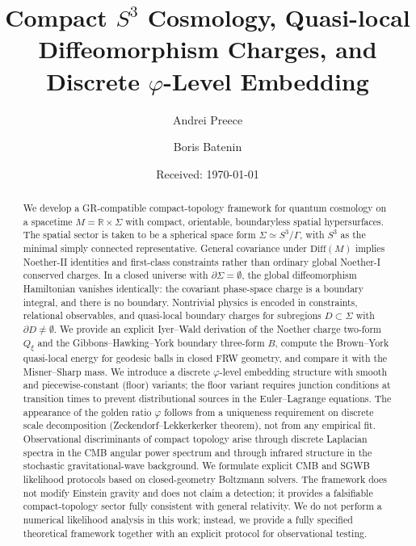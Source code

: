 \documentclass[12pt,a4paper]{article}
\newcommand{\Sig}{\Sigma}           %
\newcommand{\pa}{\partial}          %
\newcommand{\Diff}{\mathrm{Diff}}
\newcommand{\Qxi}{Q_\xi}
\begin{document}
\title{Compact $S^3$ Cosmology, Quasi-local Diffeomorphism
       Charges, and Discrete $\varphi$-Level Embedding}



\author[1]{Andrei Preece}
\author[1]{Boris Batenin}


\date{Received: \today}

\maketitle

\begin{abstract}
We develop a GR-compatible compact-topology framework for
quantum cosmology on a spacetime $M = \mathbb{R}\times\Sig$
with compact, orientable, boundaryless spatial hypersurfaces.
The spatial sector is taken to be a spherical space form
$\Sig \simeq S^3/\Gamma$, with $S^3$ as the minimal simply
connected representative. General covariance under
$\Diff(M)$ implies Noether-II identities and first-class
constraints rather than ordinary global Noether-I conserved
charges. In a closed universe with $\pa\Sig = \emptyset$,
the global diffeomorphism Hamiltonian vanishes identically:
the covariant phase-space charge is a boundary integral, and
there is no boundary. Nontrivial physics is encoded in
constraints, relational observables, and quasi-local boundary
charges for subregions $D\subset\Sig$ with $\pa D\neq\emptyset$.
We provide an explicit Iyer--Wald derivation of the Noether
charge two-form $\Qxi$ and the Gibbons--Hawking--York boundary
three-form $B$, compute the Brown--York quasi-local energy
for geodesic balls in closed FRW geometry, and compare it
with the Misner--Sharp mass. We introduce a discrete
$\varphi$-level embedding structure with smooth and
piecewise-constant (floor) variants; the floor variant
requires junction conditions at transition times to prevent
distributional sources in the Euler--Lagrange equations.
The appearance of the golden ratio $\varphi$ follows from a
uniqueness requirement on discrete scale decomposition
(Zeckendorf--Lekkerkerker theorem), not from any empirical
fit. Observational discriminants of compact topology arise
through discrete Laplacian spectra in the CMB angular power
spectrum and through infrared structure in the stochastic
gravitational-wave background. We formulate explicit CMB and
SGWB likelihood protocols based on closed-geometry
Boltzmann solvers. The framework does not modify Einstein
gravity and does not claim a detection; it provides a
falsifiable compact-topology sector fully consistent with
general relativity.
We do not perform a numerical likelihood analysis in this
work; instead, we provide a fully specified theoretical
framework together with an explicit protocol for
observational testing.
\end{abstract}
\end{document}
